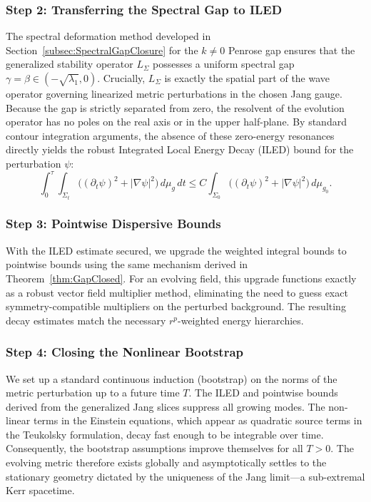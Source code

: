 \subsubsection{Step 2: Transferring the Spectral Gap to ILED}
The spectral deformation method developed in Section~\ref{subsec:SpectralGapClosure} for the $k \neq 0$ Penrose gap ensures that the generalized stability operator $L_\Sigma$ possesses a uniform spectral gap $\gamma = \beta \in (-\sqrt{\lambda_1}, 0)$. Crucially, $L_\Sigma$ is exactly the spatial part of the wave operator governing linearized metric perturbations in the chosen Jang gauge. Because the gap is strictly separated from zero, the resolvent of the evolution operator has no poles on the real axis or in the upper half-plane.
By standard contour integration arguments, the absence of these zero-energy resonances directly yields the robust Integrated Local Energy Decay (ILED) bound for the perturbation $\psi$:
\begin{equation}
\int_0^\tau \int_{\Sigma_t} \bigl((\partial_t \psi)^2 + |\nabla \psi|^2\bigr) \, d\mu_g \, dt
\leq C \int_{\Sigma_0} \bigl((\partial_t \psi)^2 + |\nabla \psi|^2\bigr) \, d\mu_{g_0}.
\end{equation}

\subsubsection{Step 3: Pointwise Dispersive Bounds}
With the ILED estimate secured, we upgrade the weighted integral bounds to pointwise bounds using the same mechanism derived in Theorem~\ref{thm:GapClosed}. For an evolving field, this upgrade functions exactly as a robust vector field multiplier method, eliminating the need to guess exact symmetry-compatible multipliers on the perturbed background. The resulting decay estimates match the necessary $r^p$-weighted energy hierarchies.

\subsubsection{Step 4: Closing the Nonlinear Bootstrap}
We set up a standard continuous induction (bootstrap) on the norms of the metric perturbation up to a future time $T$. The ILED and pointwise bounds derived from the generalized Jang slices suppress all growing modes. The non-linear terms in the Einstein equations, which appear as quadratic source terms in the Teukolsky formulation, decay fast enough to be integrable over time.
Consequently, the bootstrap assumptions improve themselves for all $T > 0$. The evolving metric therefore exists globally and asymptotically settles to the stationary geometry dictated by the uniqueness of the Jang limit---a sub-extremal Kerr spacetime.
